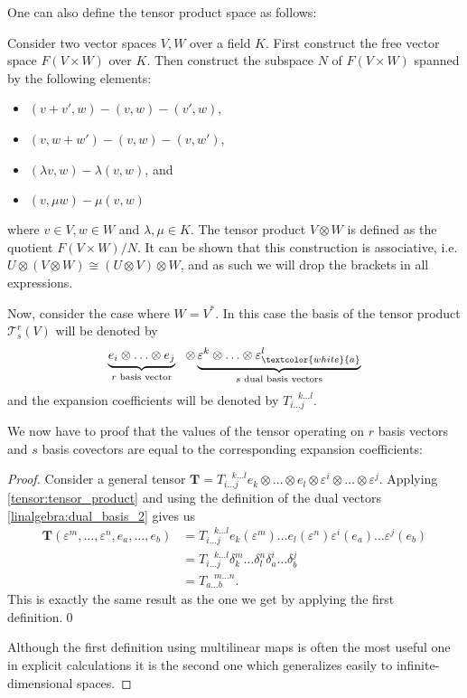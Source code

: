     One can also define the tensor product space as follows:
    \begin{adefinition}
        Consider two vector spaces $V,W$ over a field $K$. First construct the free vector space $F(V\times W)$ over $K$. Then construct the subspace $N$ of $F(V\times W)$ spanned by the following elements:
        \begin{itemize}
            \item $(v+v',w) - (v,w) - (v',w)$,
            \item $(v,w+w') - (v,w) - (v,w')$,
            \item $(\lambda v,w) - \lambda(v,w)$, and
            \item $(v,\mu w) - \mu(v,w)$
        \end{itemize}
        where $v\in V,w\in W$ and $\lambda,\mu\in K$. The tensor product $V\otimes W$ is defined as the quotient $F(V\times W)/N$. It can be shown that this construction is associative, i.e. $U\otimes(V\otimes W)\cong(U\otimes V)\otimes W$, and as such we will drop the brackets in all expressions.

        Now, consider the case where $W=V^*$. In this case the basis of the tensor product $\mathcal{T}^r_s(V)$ will be denoted by
        \[\underbrace{e_i\otimes\ldots\otimes e_j}_{r\text{ basis vector}}\ \ \otimes\underbrace{\varepsilon^k\otimes\ldots\otimes \varepsilon^l_{\textcolor{white}{a}}}_{s\text{ dual basis vectors}}\]
        and the expansion coefficients will be denoted by $T_{i\ldots j}^{\ \ \ \ k\ldots l}$.
    \end{adefinition}


    We now have to proof that the values of the tensor operating on $r$ basis vectors and $s$ basis covectors are equal to the corresponding expansion coefficients:
    \begin{proof}
        Consider a general tensor $\mathbf{T} = T_{i\ldots j}^{\ \ \ \ k\ldots l} e_k\otimes\ldots\otimes e_l\otimes\varepsilon^i\otimes\ldots\otimes\varepsilon^j$. Applying \ref{tensor:tensor_product} and using the definition of the dual vectors \ref{linalgebra:dual_basis_2} gives us
        \begin{align*}
            \mathbf{T}(\varepsilon^m, \ldots, \varepsilon^n, e_a, \ldots, e_b) &= T_{i\ldots j}^{\ \ \ \ k\ldots l}e_k(\varepsilon^m)\ldots e_l(\varepsilon^n)\varepsilon^i(e_a)\ldots\varepsilon^j(e_b)\\
            &= T_{i\ldots j}^{\ \ \ \ k\ldots l}\delta_k^m\ldots\delta_l^n\delta_a^i\ldots\delta_b^j\\
            &= T_{a\ldots b}^{\ \ \ \ m\ldots n}.
        \end{align*}
        This is exactly the same result as the one we get by applying the first definition.\qed

        Although the first definition using multilinear maps is often the most useful one in explicit calculations it is the second one which generalizes easily to infinite-dimensional spaces.
    \end{proof}

